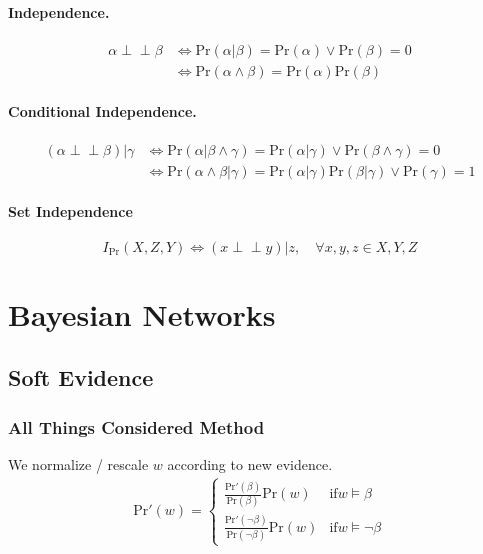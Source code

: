 \documentclass[11pt]{article}
\newcommand{\independent}{\perp \!\!\! \perp}
\newcommand{\pr}{\mathrm{Pr}}
\begin{document}
\paragraph{Independence.}  
\begin{align}
	\alpha \independent \beta 
	& \iff \pr ( \alpha | \beta) = \pr ( \alpha) \vee \pr( \beta) = 0 \\
	& \iff \pr ( \alpha \land \beta) = \pr(\alpha) \pr ( \beta)
\end{align}

\paragraph{Conditional Independence.}
\begin{align}
	(\alpha \independent \beta) | \gamma 
	&\iff \pr ( \alpha | \beta \land \gamma) = \pr ( \alpha | \gamma) \vee \pr(\beta \land \gamma) = 0 \\
	&\iff \pr ( \alpha \land \beta | \gamma) = \pr ( \alpha | \gamma ) \pr(\beta | \gamma ) \vee \pr ( \gamma) = 1
\end{align}

\paragraph{Set Independence}
\begin{equation}
	I_{\pr} (X, Z, Y) \iff (x \independent y) | z, \quad \forall x, y, z \in X, Y, Z
\end{equation}

\section{Bayesian Networks}
\subsection{Soft Evidence}
\subsubsection{All Things Considered Method}
We normalize / rescale $w$ according to new evidence. 
\begin{align}
\pr' (w) = \begin{cases}
	\frac{\pr ' (\beta)}{\pr (\beta)} \pr ( w) &  \text{if} w \vDash \beta \\
	\frac{\pr' (\neg \beta)}{\pr (\neg \beta)} \pr (w) & \text{if} w \vDash \neg \beta
\end{cases}
\end{align}
\end{document}
